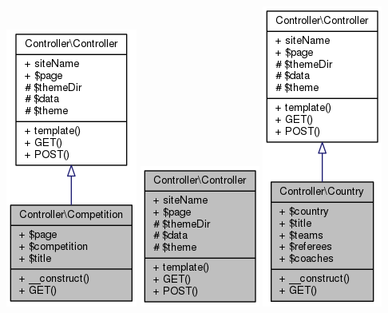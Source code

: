\documentclass[11pt]{article}
\begin{document}
\includegraphics[scale=0.4]{UML_Controller_1_1Competition.png}
\includegraphics[scale=0.4]{UML_Controller_1_1Controller.png}
\includegraphics[scale=0.4]{UML_Controller_1_1Country.png}
\end{document}
